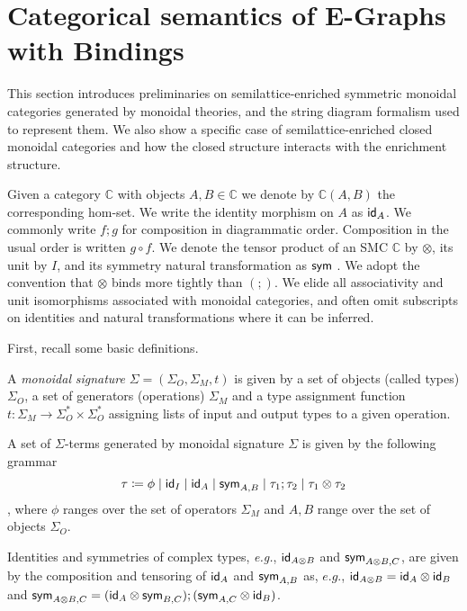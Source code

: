 \section{Categorical semantics of E-Graphs with Bindings}

This section introduces preliminaries on semilattice-enriched symmetric monoidal categories generated by monoidal theories, and the string diagram formalism used to represent them.
We also show a specific case of semilattice-enriched closed monoidal categories and how the closed structure interacts with the enrichment structure.

Given a category $\mathbb{C}$  with objects $A,B \in \mathbb{C}$ we denote by $\mathbb{C}(A,B)$ the corresponding hom-set.  
We write the identity morphism on $A$ as $\textsf{id}_A$.  
We commonly write $f;g$ for composition in diagrammatic order.  
Composition in the usual order is written $g \circ f$.  
We denote the tensor product of an SMC $\mathbb{C}$ by $\otimes$,  its unit by $I$, and its symmetry natural transformation as $\textsf{sym}$ \cite{maclane}.  
We adopt the convention that $\otimes$ binds more tightly than $(;\!)$.  
We elide all associativity and unit isomorphisms associated with monoidal categories,  and often omit subscripts on identities and natural transformations where it can be inferred.  


First, recall some basic definitions.
\begin{definition}
A \textit{monoidal} \textit{signature} $\Sigma = (\Sigma_{O}, \Sigma_{M}, t)$ is given by a set of objects (called types) $\Sigma_{O}$, a set of generators (operations) $\Sigma_{M}$ and a type assignment function $t : \Sigma_{M} \to \Sigma_{O}^{*} \times \Sigma_{O}^{*}$ assigning lists of input and output types to a given operation.
\end{definition}

\begin{definition}
A set of $\Sigma$-terms generated by monoidal signature $\Sigma$ is given by the following grammar
\[
\tau \coloneqq \phi \;|\; \textsf{id}_{I} \;|\; \textsf{id}_{A} \;|\; \textsf{sym}_{A,B} \;|\; \tau_{1};\tau_{2} \;|\; \tau_{1} \otimes \tau_{2}
\],
where $\phi$ ranges over the set of operators $\Sigma_{M}$ and $A,B$ range over the set of objects $\Sigma_{O}$.
\end{definition}

Identities and symmetries of complex types, \textit{e.g.}, $\textsf{id}_{A \otimes B}$ and $\textsf{sym}_{A \otimes B, C}$, are given by the composition and tensoring of $\textsf{id}_{A}$ and $\textsf{sym}_{A,B}$ as, $\textit{e.g.}$, $\textsf{id}_{A \otimes B} = \textsf{id}_{A} \otimes \textsf{id}_{B}$ and $\textsf{sym}_{A \otimes B, C} = (\textsf{id}_{A} \otimes \textsf{sym}_{B,C});(\textsf{sym}_{A,C} \otimes \textsf{id}_{B})$.

